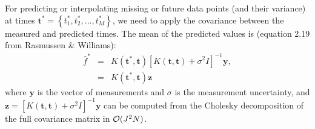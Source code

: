 \documentclass[manuscript, letterpaper]{aastex6}
\newcommand{\project}[1]{\textsf{#1}}
\newcommand{\celerite}{\project{celerite}}
\newcommand{\bvec}[1]{{\ensuremath{\boldsymbol{#1}}}}
\begin{document}

For predicting or interpolating missing or future data points (and their variance) at times $\bvec{t^*} = \left\{t_{1}^*,t_{2}^*,...,t_{M}^*\right\}$, we need to apply the covariance between the measured and predicted times.  The mean of the predicted values is (equation 2.19 from Rasmussen \& Williams):
\begin{eqnarray}
\bar f^* &=& K(\bvec{t^*},\bvec{t}) \left[K(\bvec{t},\bvec{t})+\sigma^2 I\right]^{-1} \bvec{y},\\
&=& K(\bvec{t^*},\bvec{t}) \bvec{z}
\end{eqnarray}
where $\bvec{y}$ is the vector of measurements and $\sigma$ is the measurement uncertainty, and
$\bvec{z} = \left[K(\bvec{t},\bvec{t})+\sigma^2 I\right]^{-1} \bvec{y}$ can be computed from
the Cholesky decomposition of the full covariance matrix in ${\cal O}(J^2N)$.
\end{document}
